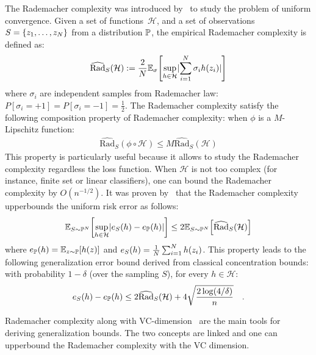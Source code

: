 The Rademacher complexity was introduced by~\cite{bartlett2002rademacher} to study the problem of uniform convergence. Given a set of functions~$\mathcal{H}$, and a set of observations $S=\{z_1,\dots,z_N\}$ from a distribution $\mathbb{P}$, the empirical Rademacher complexity is defined as:
\begin{align*}
    \widehat{\text{Rad}}_S(\mathcal{H}):=\frac2\numsamples\mathbb{E}_{\sigma}\left[\sup_{h\in\mathcal{H}}\lvert\sum_{i=1}^\numsamples\sigma_i h(z_i)\rvert\right]
\end{align*}
where $\sigma_i$ are independent samples from Rademacher law: $P[\sigma_i =+1] = P[\sigma_i =-1]=\frac12$. The Rademacher complexity satisfy the following composition property of Rademacher complexity: when $\phi$ is a $M$-Lipschitz function:
\begin{align*}
    \widehat{\text{Rad}}_S(\phi\circ\mathcal{H}) \leq M\widehat{\text{Rad}}_S(\mathcal{H})
\end{align*}
This property is particularly useful because it allows to study the Rademacher complexity regardless the loss function.
When $\mathcal{H}$ is not too complex (for instance, finite set or linear classifiers), one can bound the Rademacher complexity  by $O(n^{-1/2})$. It was proven by~\citet{bartlett2002rademacher} that the Rademacher complexity upperbounds the uniform risk error as follows:
\begin{align*}
    \mathbb{E}_{S\sim\PP^\numsamples}\left[\sup_{h\in\mathcal{H}}\lvert e_S(h)-e_\PP(h)\rvert\right]\leq 2\mathbb{E}_{S\sim\PP^\numsamples}\left[\widehat{\text{Rad}}_S(\mathcal{H})\right]
\end{align*}
where $e_\PP(h)=\mathbb{E}_{z\sim\PP}\left[h(z)\right]$ and $e_S(h)=\frac1{N} \sum_{i=1}^N h(z_i)$. This property leads to the following generalization error bound derived from classical concentration bounds: with probability $1-\delta$ (over the sampling $S$), for every $h\in \mathcal{H}$:
\begin{align*}
    e_S(h)-e_{\mathbb{P}}(h)\leq 2  \widehat{\text{Rad}}_S(\mathcal{H})+4\sqrt{\frac{2\log(4/\delta)}{n}}\quad.
\end{align*}


Rademacher complexity along with VC-dimension~\citep{vapnik1998} are the main tools for deriving generalization bounds. The two concepts are linked and one can upperbound the Rademacher complexity with the VC dimension.



